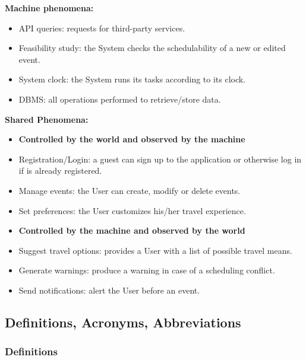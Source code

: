 \noindent
\textbf{Machine phenomena:}
\begin{itemize}
	\item API queries: requests for third-party services.
	\item Feasibility study: the System checks the schedulability of a new or edited event.
	\item System clock: the System runs its tasks according to its clock.
	\item DBMS: all operations performed to retrieve/store data.
\end{itemize}

\noindent
\textbf{Shared Phenomena:}
\begin{itemize}
	\item[] \textbf{Controlled by the world and observed by the machine}
	\item Registration/Login: a guest can sign up to the application or otherwise log in if is already registered.
	\item Manage events: the User can create, modify or delete events.
	\item Set preferences: the User customizes his/her travel experience.
	\item[] \textbf{Controlled by the machine and observed by the world}
	\item Suggest travel options: provides a User with a list of possible travel means.
	\item Generate warnings: produce a warning in case of a scheduling conflict.
	\item Send notifications: alert the User before an event.
\end{itemize}

\subsection{Definitions, Acronyms, Abbreviations}

\subsubsection{Definitions}

